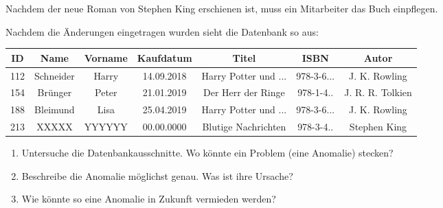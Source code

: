 \documentclass[10pt, a5paper,landscape]{arbeitsblatt}
\begin{document}
Nachdem der neue Roman von Stephen King erschienen ist, muss ein Mitarbeiter das Buch einpflegen.

Nachdem die Änderungen eingetragen wurden sieht die Datenbank so aus:

{\footnotesize
\begin{tabular}{|*{7}{c|}}\hline
	\rowcolor{ab.tabelle.kopf.hg} ID & Name & Vorname & Kaufdatum & Titel & ISBN & Autor\\ \hline
	112 & Schneider & Harry & 14.09.2018 & Harry Potter und ... & 978-3-6... & J. K. Rowling \\\hline
	154 & Brünger & Peter & 21.01.2019 & Der Herr der Ringe & 978-1-4.. & J. R. R. Tolkien \\\hline
	188 & Bleimund & Lisa & 25.04.2019 & Harry Potter und ... & 978-3-6... & J. K. Rowling \\\hline
	213 & XXXXX & YYYYYY & 00.00.0000 & Blutige Nachrichten & 978-3-4.. & Stephen King \\\hline
\end{tabular}}

\begin{aufgabe}
\begin{enumerate}
	\item Untersuche die Datenbankausschnitte. Wo könnte ein Problem (eine Anomalie) stecken?
	\item Beschreibe die Anomalie möglichst genau. Was ist ihre Ursache?
	\item Wie könnte so eine Anomalie in Zukunft vermieden werden?
\end{enumerate}
\end{aufgabe}
\end{document}
